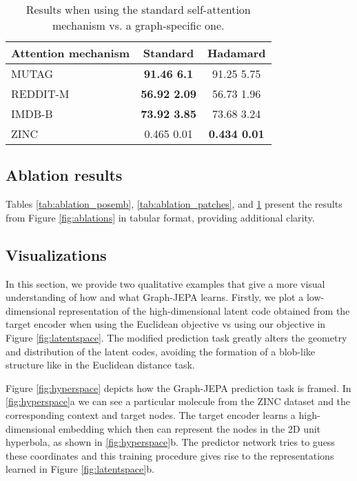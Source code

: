 \documentclass{article} \usepackage{iclr2024_conference,times}
\begin{document}
\begin{table}
    \centering
    \caption{Results when using the standard self-attention mechanism vs. a graph-specific one.}
    \begin{tabular}{|l|c|c|}
    \hline
    Attention mechanism & Standard & Hadamard \\ \hline
    MUTAG    & \textbf{91.46  6.1}  & 91.25  5.75\\ \hline
    REDDIT-M & \textbf{56.92  2.09} & 56.73  1.96\\ \hline
    IMDB-B   & \textbf{73.92  3.85} & 73.68  3.24\\ \hline
    ZINC     & 0.465  0.01 & \textbf{0.434  0.01}\\ \hline
    \end{tabular}
    \label{tab:ablation_attn}
\end{table}

\subsection{Ablation results} \label{app:ablation-tab}
Tables \ref{tab:ablation_posemb}, \ref{tab:ablation_patches}, and \ref{tab:ablation_attn} present the results from Figure \ref{fig:ablations} in tabular format, providing additional clarity.

\subsection{Visualizations} \label{app:latent-fig}
In this section, we provide two qualitative examples that give a more visual understanding of how and what Graph-JEPA learns. Firstly, we plot a low-dimensional representation of the high-dimensional latent code obtained from the target encoder when using the Euclidean objective vs using our objective in Figure \ref{fig:latentspace}. The modified prediction task greatly alters the geometry and distribution of the latent codes, avoiding the formation of a blob-like structure like in the Euclidean distance task. 

Figure \ref{fig:hyperspace} depicts how the Graph-JEPA prediction task is framed. In \ref{fig:hyperspace}a we can see a particular molecule from the ZINC dataset and the corresponding context and target nodes. The target encoder learns a high-dimensional embedding which then can represent the nodes in the 2D unit hyperbola, as shown in \ref{fig:hyperspace}b. The predictor network tries to guess these coordinates and this training procedure gives rise to the representations learned in Figure \ref{fig:latentspace}b.
\end{document}

